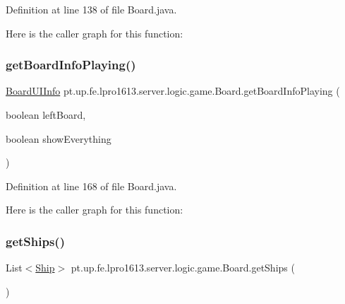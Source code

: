 Definition at line 138 of file Board.\+java.

Here is the caller graph for this function\+:
\hypertarget{classpt_1_1up_1_1fe_1_1lpro1613_1_1server_1_1logic_1_1game_1_1_board_aad5a0afec5d59e53ed3e1e7f3aedcc25}{}\label{classpt_1_1up_1_1fe_1_1lpro1613_1_1server_1_1logic_1_1game_1_1_board_aad5a0afec5d59e53ed3e1e7f3aedcc25} 
\subsubsection{\texorpdfstring{get\+Board\+Info\+Playing()}{getBoardInfoPlaying()}}
{\footnotesize\ttfamily \hyperlink{classpt_1_1up_1_1fe_1_1lpro1613_1_1sharedlib_1_1tuples_1_1_board_u_i_info}{Board\+U\+I\+Info} pt.\+up.\+fe.\+lpro1613.\+server.\+logic.\+game.\+Board.\+get\+Board\+Info\+Playing (\begin{DoxyParamCaption}\item[{boolean}]{left\+Board,  }\item[{boolean}]{show\+Everything }\end{DoxyParamCaption})}



Definition at line 168 of file Board.\+java.

Here is the caller graph for this function\+:
\hypertarget{classpt_1_1up_1_1fe_1_1lpro1613_1_1server_1_1logic_1_1game_1_1_board_aaf2e7b01d28bbf83f6878de30f5300fc}{}\label{classpt_1_1up_1_1fe_1_1lpro1613_1_1server_1_1logic_1_1game_1_1_board_aaf2e7b01d28bbf83f6878de30f5300fc} 
\subsubsection{\texorpdfstring{get\+Ships()}{getShips()}}
{\footnotesize\ttfamily List$<$\hyperlink{classpt_1_1up_1_1fe_1_1lpro1613_1_1server_1_1logic_1_1game_1_1_ship}{Ship}$>$ pt.\+up.\+fe.\+lpro1613.\+server.\+logic.\+game.\+Board.\+get\+Ships (\begin{DoxyParamCaption}{ }\end{DoxyParamCaption})}



